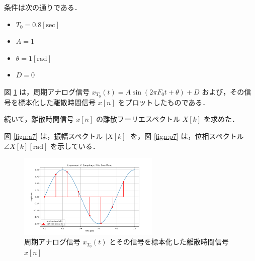 \documentclass[fleqn, a4paper. 12pt]{jsarticle}
\begin{document}
  条件は次の通りである．

  \begin{itemize}
    \item $T_0 = 0.8 [\mathrm{sec}]$
    \item $A = 1$
    \item $\theta = 1 [\mathrm{rad}]$
    \item $D = 0$
  \end{itemize}

  図 \ref{fig:s7} は，周期アナログ信号 $x_{T_0}(t)=A \sin \left(2 \pi F_0 t+\theta\right)+D$ および，その信号を標本化した離散時間信号 $x[n]$ をプロットしたものである．
  
  続いて，離散時間信号 $x[n]$ の離散フーリエスペクトル $X[k]$ を求めた．
  
  図 \ref{fign:a7} は，振幅スペクトル $|X[k]|$ を，図 \ref{fign:p7} は，位相スペクトル $\angle X[k][\mathrm{rad}]$ を示している．

  \begin{figure}[!h]
    \centering
    \includegraphics[width=0.6\textwidth]{sampling_experiment_7.png}
    \caption{周期アナログ信号 $x_{T_0}(t)$ とその信号を標本化した離散時間信号 $x[n]$}
    \label{fig:s7}
  \end{figure}
\end{document}
